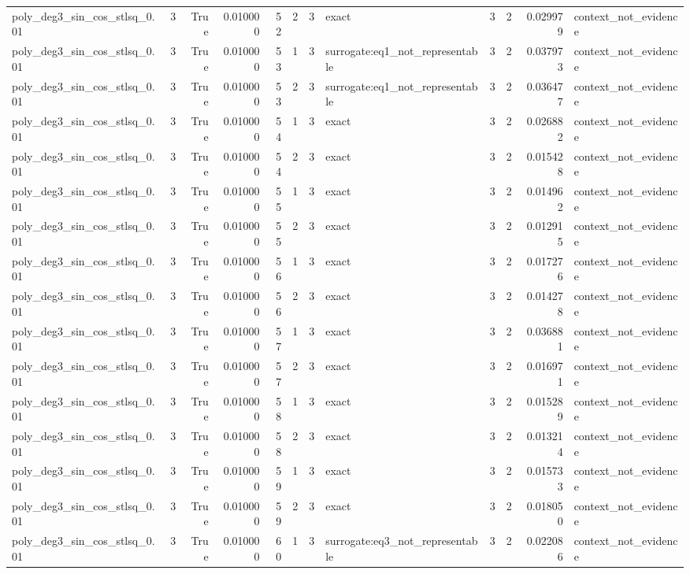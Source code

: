 \begin{tabular}{lrrrrrrlrrrl}
poly\_deg3\_sin\_cos\_stlsq\_0.01 & 3 & True & 0.010000 & 52 & 2 & 3 & exact & 3 & 2 & 0.029979 & context\_not\_evidence \\
poly\_deg3\_sin\_cos\_stlsq\_0.01 & 3 & True & 0.010000 & 53 & 1 & 3 & surrogate:eq1\_not\_representable & 3 & 2 & 0.037973 & context\_not\_evidence \\
poly\_deg3\_sin\_cos\_stlsq\_0.01 & 3 & True & 0.010000 & 53 & 2 & 3 & surrogate:eq1\_not\_representable & 3 & 2 & 0.036477 & context\_not\_evidence \\
poly\_deg3\_sin\_cos\_stlsq\_0.01 & 3 & True & 0.010000 & 54 & 1 & 3 & exact & 3 & 2 & 0.026882 & context\_not\_evidence \\
poly\_deg3\_sin\_cos\_stlsq\_0.01 & 3 & True & 0.010000 & 54 & 2 & 3 & exact & 3 & 2 & 0.015428 & context\_not\_evidence \\
poly\_deg3\_sin\_cos\_stlsq\_0.01 & 3 & True & 0.010000 & 55 & 1 & 3 & exact & 3 & 2 & 0.014962 & context\_not\_evidence \\
poly\_deg3\_sin\_cos\_stlsq\_0.01 & 3 & True & 0.010000 & 55 & 2 & 3 & exact & 3 & 2 & 0.012915 & context\_not\_evidence \\
poly\_deg3\_sin\_cos\_stlsq\_0.01 & 3 & True & 0.010000 & 56 & 1 & 3 & exact & 3 & 2 & 0.017276 & context\_not\_evidence \\
poly\_deg3\_sin\_cos\_stlsq\_0.01 & 3 & True & 0.010000 & 56 & 2 & 3 & exact & 3 & 2 & 0.014278 & context\_not\_evidence \\
poly\_deg3\_sin\_cos\_stlsq\_0.01 & 3 & True & 0.010000 & 57 & 1 & 3 & exact & 3 & 2 & 0.036881 & context\_not\_evidence \\
poly\_deg3\_sin\_cos\_stlsq\_0.01 & 3 & True & 0.010000 & 57 & 2 & 3 & exact & 3 & 2 & 0.016971 & context\_not\_evidence \\
poly\_deg3\_sin\_cos\_stlsq\_0.01 & 3 & True & 0.010000 & 58 & 1 & 3 & exact & 3 & 2 & 0.015289 & context\_not\_evidence \\
poly\_deg3\_sin\_cos\_stlsq\_0.01 & 3 & True & 0.010000 & 58 & 2 & 3 & exact & 3 & 2 & 0.013214 & context\_not\_evidence \\
poly\_deg3\_sin\_cos\_stlsq\_0.01 & 3 & True & 0.010000 & 59 & 1 & 3 & exact & 3 & 2 & 0.015733 & context\_not\_evidence \\
poly\_deg3\_sin\_cos\_stlsq\_0.01 & 3 & True & 0.010000 & 59 & 2 & 3 & exact & 3 & 2 & 0.018050 & context\_not\_evidence \\
poly\_deg3\_sin\_cos\_stlsq\_0.01 & 3 & True & 0.010000 & 60 & 1 & 3 & surrogate:eq3\_not\_representable & 3 & 2 & 0.022086 & context\_not\_evidence \\

\end{tabular}

